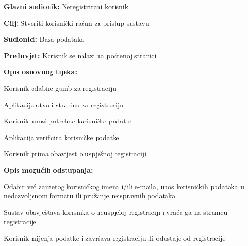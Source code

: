 				\noindent {}
					\begin{packed_item}
	
						\item \textbf{Glavni sudionik: }Neregistrirani korisnik
						\item  \textbf{Cilj:} Stvoriti korisnički račun za pristup sustavu
						\item  \textbf{Sudionici:} Baza podataka
						\item  \textbf{Preduvjet:} Korisnik se nalazi na počtenoj stranici
						\item  \textbf{Opis osnovnog tijeka:}
						
						\item[] \begin{packed_enum}
	
							\item Korisnik odabire gumb za registraciju
							\item Aplikacija otvori stranicu za registraciju
							\item Korisnik unosi potrebne korisničke podatke
							\item Aplikacija verificira korisničke podatke
							\item Korisnik prima obavijest o uspješnoj registraciji

						\end{packed_enum}
						
						\item  \textbf{Opis mogućih odstupanja:}
						
						\item[] \begin{packed_item}
	
							\item[4.a] Odabir već zauzetog korisničkog imena i/ili e-maila, unos korisničkih podataka u nedozvoljenom formatu ili pružanje neispravnih podataka
							
								\begin{packed_item}
								
									\item Sustav obavještava korisnika o neuspjeloj registraciji i vraća ga na stranicu registracije
									\item Korisnik mijenja podatke i završava registraciju ili odustaje od registracije
								
								\end{packed_item}
							
						\end{packed_item}					
					\end{packed_item}
					
